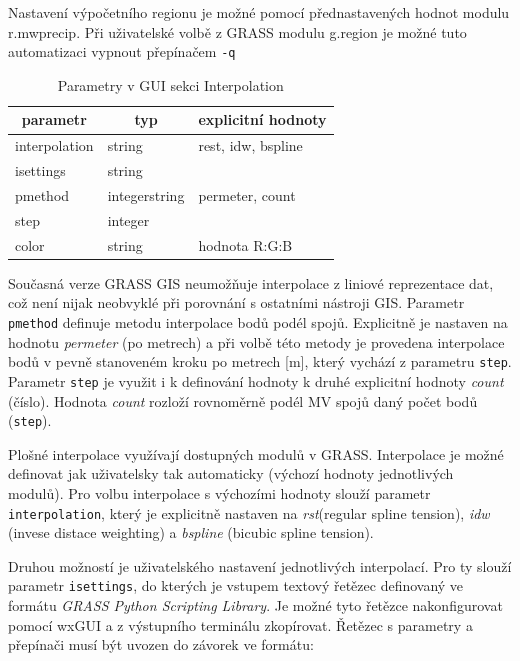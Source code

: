 \documentclass[a4paper,12pt]{report}
\begin{document}
Nastavení  výpočetního regionu je možné pomocí přednastavených hodnot modulu r.mwprecip. Při uživatelské volbě z GRASS modulu g.region je možné tuto automatizaci vypnout přepínačem \texttt{-q}
\begin{table}[h]
\centering
\begin{tabular}{|lll|}
\hline
\multicolumn{1}{|c}{parametr} & \multicolumn{1}{c}{typ} & \multicolumn{1}{c|}{explicitní hodnoty} \\ \hline\hline
interpolation                          & string                  & rest, idw, bspline           \\
isettings                              & string                  &                              \\
pmethod                                & integerstring           & permeter, count              \\
step                                   & integer                 &                              \\
color                                  & string                  & hodnota R:G:B                \\ \hline
\end{tabular}
\caption{Parametry v GUI sekci Interpolation}
\end{table}
Současná verze GRASS GIS neumožňuje interpolace z liniové reprezentace dat, což není nijak neobvyklé při porovnání s ostatními nástroji GIS. Parametr \texttt{pmethod} definuje metodu interpolace bodů podél spojů. Explicitně je nastaven na hodnotu \emph{permeter} (po metrech) a při volbě této metody je provedena interpolace bodů v pevně stanoveném kroku po metrech [m], který vychází z parametru \texttt{step}. Parametr \texttt{step} je využit i k definování hodnoty k druhé explicitní hodnoty \emph{count} (číslo). Hodnota \emph{count} rozloží rovnoměrně podél MV spojů daný počet bodů (\texttt{step}).

Plošné interpolace využívají dostupných modulů v GRASS. Interpolace je možné definovat jak uživatelsky tak automaticky (výchozí hodnoty jednotlivých modulů). Pro volbu interpolace s výchozími hodnoty slouží parametr \texttt{interpolation}, který je explicitně nastaven na \emph{rst}(regular spline tension), \emph{idw} (invese distace weighting) a \emph{bspline} (bicubic spline tension). 

Druhou možností je uživatelského nastavení jednotlivých interpolací. Pro ty slouží parametr \texttt{isettings}, do kterých je vstupem textový řetězec definovaný ve formátu \textit{GRASS Python Scripting Library}. Je možné tyto řetězce nakonfigurovat pomocí wxGUI a z výstupního terminálu zkopírovat. Řetězec s parametry a přepínači musí být uvozen do závorek ve formátu:     
\end{document}
